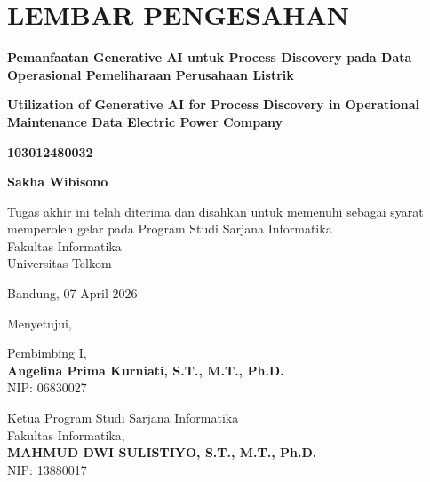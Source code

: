 \chapter*{LEMBAR PENGESAHAN}

\begin{singlespacing}

\begin{center}
  {\large\bfseries
    Pemanfaatan Generative AI untuk Process Discovery pada Data
Operasional Pemeliharaan Perusahaan Listrik
  \par}

  \vspace{0.3cm}

   {\large\bfseries
   Utilization of Generative AI for Process Discovery in
Operational Maintenance Data Electric Power Company
   \par}
\end{center}

\vspace{0.3cm}

\begin{center}
  {\large\bfseries 103012480032\par}
  {\large\bfseries Sakha Wibisono\par}
\end{center}

\vspace{0.3cm}

\begin{center}
  Tugas akhir ini telah diterima dan disahkan untuk memenuhi sebagai syarat memperoleh
  gelar pada Program Studi Sarjana Informatika\\
  Fakultas Informatika\\
  \vspace{0.2cm}
  Universitas Telkom
\end{center}

\vspace{0.3cm}

\begin{center}
  Bandung, 07 April 2026
\end{center}

\vspace{0.2cm}
\begin{center}
  Menyetujui,
\end{center}

\vspace{1.0cm}

\begin{center}
  Pembimbing I, \\[2.0cm]
  \textbf{Angelina Prima Kurniati, S.T., M.T., Ph.D.}\\
  NIP: 06830027
\end{center}

\vspace{1.0cm}

\begin{center}
  Ketua Program Studi Sarjana Informatika\\
  Fakultas Informatika,\\[2.0cm]
  \textbf{MAHMUD DWI SULISTIYO, S.T., M.T., Ph.D.}\\
  NIP: 13880017
\end{center}

\end{singlespacing}

